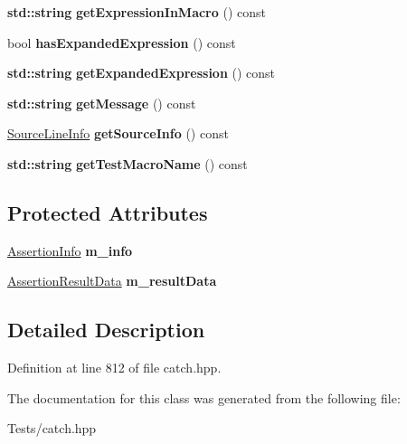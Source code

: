 \begin{DoxyCompactItemize}
\mbox{\label{class_catch_1_1_assertion_result_aac35a0ca42d33bff6467c76573730f5e}} 
\textbf{ std\+::string} {\bfseries get\+Expression\+In\+Macro} () const
\item 
\mbox{\label{class_catch_1_1_assertion_result_a78c43506c2b3d8cc1fb141a97d09ec94}} 
bool {\bfseries has\+Expanded\+Expression} () const
\item 
\mbox{\label{class_catch_1_1_assertion_result_aaa46070791a6c07caaed86229b8d9d75}} 
\textbf{ std\+::string} {\bfseries get\+Expanded\+Expression} () const
\item 
\mbox{\label{class_catch_1_1_assertion_result_ae730943beed46921b09383c673e35786}} 
\textbf{ std\+::string} {\bfseries get\+Message} () const
\item 
\mbox{\label{class_catch_1_1_assertion_result_aa4d3fdbfe276a69a035762dbb790800f}} 
\hyperlink{struct_catch_1_1_source_line_info}{Source\+Line\+Info} {\bfseries get\+Source\+Info} () const
\item 
\mbox{\label{class_catch_1_1_assertion_result_aaefd9a0384282fd08a4a72aa19bd0628}} 
\textbf{ std\+::string} {\bfseries get\+Test\+Macro\+Name} () const
\end{DoxyCompactItemize}
\subsection*{Protected Attributes}
\begin{DoxyCompactItemize}
\item 
\mbox{\label{class_catch_1_1_assertion_result_a3e7236f73a51d6fc8bb9dfdefcee7772}} 
\hyperlink{struct_catch_1_1_assertion_info}{Assertion\+Info} {\bfseries m\+\_\+info}
\item 
\mbox{\label{class_catch_1_1_assertion_result_add3455b8bbedb0d643e18da67c66b4f7}} 
\hyperlink{struct_catch_1_1_assertion_result_data}{Assertion\+Result\+Data} {\bfseries m\+\_\+result\+Data}
\end{DoxyCompactItemize}


\subsection{Detailed Description}


Definition at line 812 of file catch.\+hpp.



The documentation for this class was generated from the following file\+:\begin{DoxyCompactItemize}
\item 
Tests/catch.\+hpp\end{DoxyCompactItemize}
